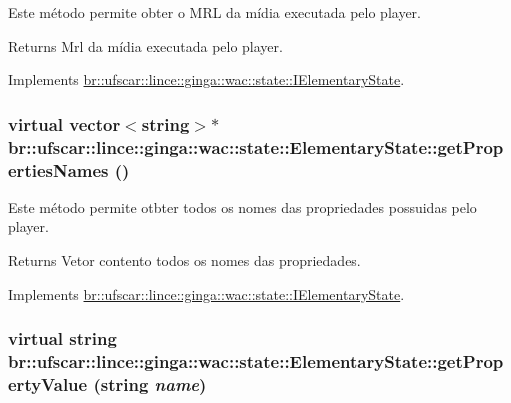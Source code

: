 Este método permite obter o MRL da mídia executada pelo player. 

\begin{DoxyReturn}{Returns}
Mrl da mídia executada pelo player. 
\end{DoxyReturn}


Implements \hyperlink{classbr_1_1ufscar_1_1lince_1_1ginga_1_1wac_1_1state_1_1IElementaryState_a5fae9abe330000d369a739626d089a87}{br::ufscar::lince::ginga::wac::state::IElementaryState}.

\hypertarget{classbr_1_1ufscar_1_1lince_1_1ginga_1_1wac_1_1state_1_1ElementaryState_a135050e832afa82aeff759a54087031b}{
\subsubsection[{getPropertiesNames}]{\setlength{\rightskip}{0pt plus 5cm}virtual vector$<$string$>$$\ast$ br::ufscar::lince::ginga::wac::state::ElementaryState::getPropertiesNames ()}}
\label{classbr_1_1ufscar_1_1lince_1_1ginga_1_1wac_1_1state_1_1ElementaryState_a135050e832afa82aeff759a54087031b}


Este método permite otbter todos os nomes das propriedades possuidas pelo player. 

\begin{DoxyReturn}{Returns}
Vetor contento todos os nomes das propriedades. 
\end{DoxyReturn}


Implements \hyperlink{classbr_1_1ufscar_1_1lince_1_1ginga_1_1wac_1_1state_1_1IElementaryState_a68c7e2ba58623cea860d6de1fc7112e7}{br::ufscar::lince::ginga::wac::state::IElementaryState}.

\hypertarget{classbr_1_1ufscar_1_1lince_1_1ginga_1_1wac_1_1state_1_1ElementaryState_aaa47390c93fda945f7ba5ee80031a137}{
\subsubsection[{getPropertyValue}]{\setlength{\rightskip}{0pt plus 5cm}virtual string br::ufscar::lince::ginga::wac::state::ElementaryState::getPropertyValue (string {\em name})}}
\label{classbr_1_1ufscar_1_1lince_1_1ginga_1_1wac_1_1state_1_1ElementaryState_aaa47390c93fda945f7ba5ee80031a137}


